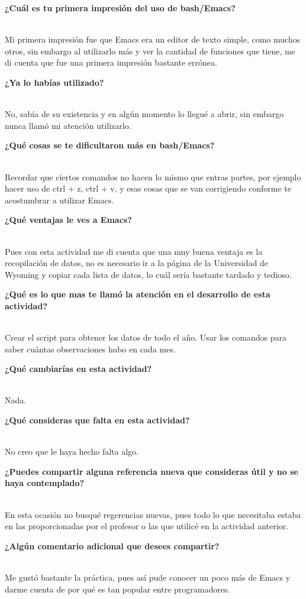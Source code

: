 \documentclass[12 pt]{article}
\begin{document}
\begin{itemize}
{\item \bfseries ¿Cuál es tu primera impresión del uso de bash/Emacs?}
\\
Mi primera impresión fue que Emacs era un editor de texto simple, como muchos otros, sin embargo al utilizarlo más y ver la cantidad de funciones que tiene, me di cuenta que fue una primera impresión bastante errónea.
{\item \bfseries ¿Ya lo habías utilizado?}
\\
No, sabía de su existencia y en algún momento lo llegué a abrir, sin embargo nunca llamó mi atención utilizarlo.

{\item \bfseries ¿Qué cosas se te dificultaron más en bash/Emacs? }
\\
Recordar que ciertos comandos no hacen lo mismo que entras partes, por ejemplo hacer uso de ctrl + z, ctrl + v, y esas cosas que se van corrigiendo conforme te acostumbrar a utilizar Emacs.

{\item \bfseries ¿Qué ventajas le ves a Emacs?}
\\
Pues con esta actividad me di cuenta que una muy buena ventaja es la recopilación de datos, no es necesario ir a la página de la Universidad de Wyoming y copiar cada lista de datos, lo cuál sería bastante tardado y tedioso.

{\item \bfseries ¿Qué es lo que mas te llamó la atención en el desarrollo de esta actividad?}
\\
Crear el script para obtener los datos de todo el año. Usar los comandos para saber cuántas observaciones hubo en cada mes.

{\item \bfseries ¿Qué cambiarías en esta actividad?}
\\
Nada.

{\item \bfseries ¿Qué consideras que falta en esta actividad?}
\\
No creo que le haya hecho falta algo.

{\item \bfseries ¿Puedes compartir alguna referencia nueva que consideras útil y no se haya contemplado?}
\\
En esta ocasión no busqué regerencias nuevas, pues todo lo que necesitaba estaba en las proporcionadas por el profesor o las que utilicé en la actividad anterior.

{\item \bfseries ¿Algún comentario adicional que desees compartir?}
\\
Me gustó bastante la práctica, pues así pude conocer un poco más de Emacs y darme cuenta de por qué es tan popular entre programadores.

\end{itemize}
\end{document}
